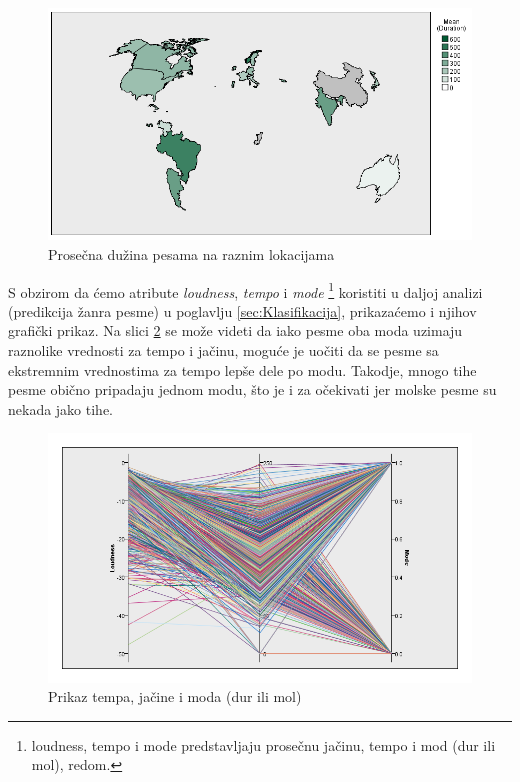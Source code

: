 \begin{figure}[H]
    \centering
    \includegraphics[scale=0.6]{resources/country-duration.png}
    \caption{Prose\v{c}na du\v{z}ina pesama na raznim lokacijama}
    \label{fig:YearDurationAvg}
\end{figure}


S obzirom da \'c{}emo atribute \emph{loudness}, \emph{tempo} i \emph{mode} \footnote{loudness, tempo i mode predstavljaju prose\v{c}nu ja\v{c}inu, tempo i mod (dur ili mol), redom.} koristiti u daljoj analizi (predikcija \v{z}anra pesme) u poglavlju \ref{sec:Klasifikacija}, prikaza\'c{}emo i njihov grafi\v{c}ki prikaz. Na slici \ref{fig:TempoMode} se mo\v{z}e videti da iako pesme oba moda uzimaju raznolike vrednosti za tempo i ja\v{c}inu, mogu\'c{}e je uo\v{c}iti da se pesme sa ekstremnim vrednostima za tempo lep\v{s}e dele po modu. Takodje, mnogo tihe pesme obi\v{c}no pripadaju jednom modu, \v{s}to je i za o\v{c}ekivati jer molske pesme su nekada jako tihe.

\begin{figure}[H]
    \centering
    \includegraphics[scale=0.4]{resources/tempo-loudness-mode.png}
    \caption{Prikaz tempa, ja\v{c}ine i moda (dur ili mol)}
    \label{fig:TempoMode}
\end{figure}

